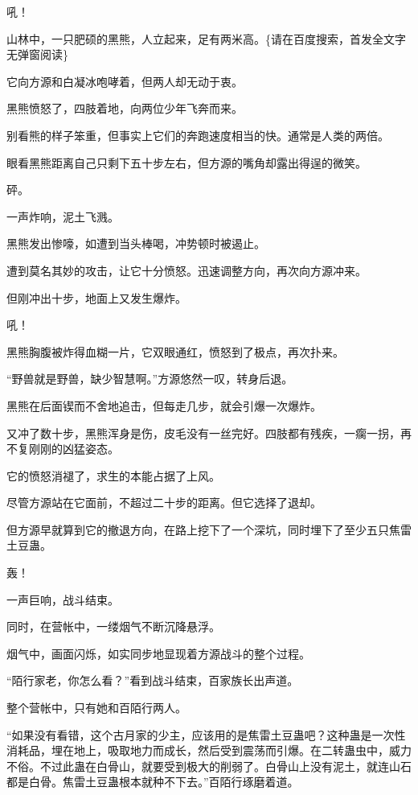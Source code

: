 
\begin{this_body}

吼！

山林中，一只肥硕的黑熊，人立起来，足有两米高。\{请在百度搜索，首发全文字无弹窗阅读\}

它向方源和白凝冰咆哮着，但两人却无动于衷。

黑熊愤怒了，四肢着地，向两位少年飞奔而来。

别看熊的样子笨重，但事实上它们的奔跑速度相当的快。通常是人类的两倍。

眼看黑熊距离自己只剩下五十步左右，但方源的嘴角却露出得逞的微笑。

砰。

一声炸响，泥土飞溅。

黑熊发出惨嚎，如遭到当头棒喝，冲势顿时被遏止。

遭到莫名其妙的攻击，让它十分愤怒。迅速调整方向，再次向方源冲来。

但刚冲出十步，地面上又发生爆炸。

吼！

黑熊胸腹被炸得血糊一片，它双眼通红，愤怒到了极点，再次扑来。

“野兽就是野兽，缺少智慧啊。”方源悠然一叹，转身后退。

黑熊在后面锲而不舍地追击，但每走几步，就会引爆一次爆炸。

又冲了数十步，黑熊浑身是伤，皮毛没有一丝完好。四肢都有残疾，一瘸一拐，再不复刚刚的凶猛姿态。

它的愤怒消褪了，求生的本能占据了上风。

尽管方源站在它面前，不超过二十步的距离。但它选择了退却。

但方源早就算到它的撤退方向，在路上挖下了一个深坑，同时埋下了至少五只焦雷土豆蛊。

轰！

一声巨响，战斗结束。

同时，在营帐中，一缕烟气不断沉降悬浮。

烟气中，画面闪烁，如实同步地显现着方源战斗的整个过程。

“陌行家老，你怎么看？”看到战斗结束，百家族长出声道。

整个营帐中，只有她和百陌行两人。

“如果没有看错，这个古月家的少主，应该用的是焦雷土豆蛊吧？这种蛊是一次性消耗品，埋在地上，吸取地力而成长，然后受到震荡而引爆。在二转蛊虫中，威力不俗。不过此蛊在白骨山，就要受到极大的削弱了。白骨山上没有泥土，就连山石都是白骨。焦雷土豆蛊根本就种不下去。”百陌行琢磨着道。


\end{this_body}
